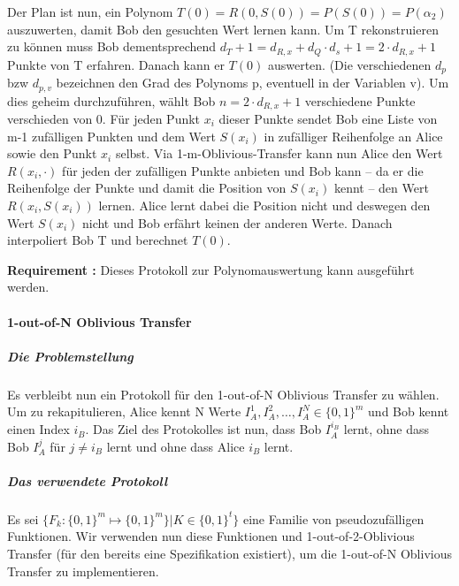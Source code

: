\documentclass{article}
\newcounter{requirementscount}{}
\newcommand{\requirement}[1] {
        \addtocounter{requirementscount}{1}
        {\bf Requirement \therequirementscount:} #1\\
    }
\begin{document}
Der Plan ist nun, ein Polynom \(T(0) = R(0,S(0)) = P(S(0)) = P(\alpha_2)\)
auszuwerten, damit Bob den gesuchten Wert lernen kann. Um T rekonstruieren
zu k\"onnen muss Bob dementsprechend 
\(d_T + 1 = d_{R,x} + d_Q \cdot d_s +1= 2\cdot d_{R,x}+1\) 
Punkte von T erfahren. Danach kann er \(T(0)\) auswerten. (Die verschiedenen
\(d_p\) bzw \(d_{p,v}\) bezeichnen den Grad des Polynoms p, eventuell in der
Variablen v). Um dies geheim durchzuf\"uhren, w\"ahlt Bob \(n = 2 \cdot d_{R,x}+1\)
verschiedene Punkte verschieden von 0. F\"ur jeden Punkt \(x_i\) dieser Punkte
sendet Bob eine Liste von m-1 zuf\"alligen Punkten und dem Wert \(S(x_i)\) 
in zuf\"alliger Reihenfolge an Alice sowie den Punkt \(x_i\) selbst.
Via 1-m-Oblivious-Transfer kann nun Alice den Wert \(R(x_i, \cdot)\) f\"ur jeden
der zuf\"alligen Punkte anbieten und Bob kann -- da er die Reihenfolge der
Punkte und damit die Position von \(S(x_i)\) kennt -- den Wert \(R(x_i, S(x_i))\)
lernen. Alice lernt dabei die Position nicht und deswegen den Wert \(S(x_i)\)
nicht und Bob erf\"ahrt keinen der anderen Werte. Danach interpoliert Bob T und berechnet 
\(T(0)\).\\
\requirement{Dieses Protokoll zur Polynomauswertung kann ausgef\"uhrt werden.}

\paragraph{1-out-of-N Oblivious Transfer}
\subparagraph{Die Problemstellung}
Es verbleibt nun ein Protokoll f\"ur den 1-out-of-N Oblivious Transfer zu
w\"ahlen. Um zu rekapitulieren, Alice kennt N Werte 
\(I_A^1, I_A^2, \dots, I_A^N \in \{0,1\}^m \)
und Bob kennt einen Index \(i_B\). Das Ziel des Protokolles ist nun, dass Bob
\(I_A^{i_B}\) lernt, ohne dass Bob \(I_A^{j}\) f\"ur \(j \neq i_B\) lernt und
ohne dass Alice \(i_B\) lernt.

\subparagraph{Das verwendete Protokoll}
Es sei \(\{F_k : \{0,1\}^m \mapsto \{0,1\}^m\} | K \in \{0,1\}^t\}\) eine Familie
von pseudozuf\"alligen Funktionen. Wir verwenden nun diese Funktionen und
1-out-of-2-Oblivious Transfer (f\"ur den bereits eine Spezifikation existiert),
um die 1-out-of-N Oblivious Transfer zu implementieren.
\end{document}
